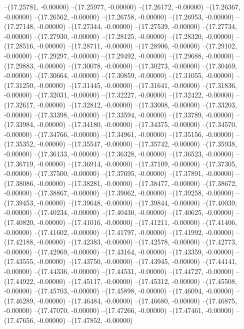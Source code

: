 --(17.25781, -0.00000)
--(17.25977, -0.00000)
--(17.26172, -0.00000)
--(17.26367, -0.00000)
--(17.26562, -0.00000)
--(17.26758, -0.00000)
--(17.26953, -0.00000)
--(17.27148, -0.00000)
--(17.27344, -0.00000)
--(17.27539, -0.00000)
--(17.27734, -0.00000)
--(17.27930, -0.00000)
--(17.28125, -0.00000)
--(17.28320, -0.00000)
--(17.28516, -0.00000)
--(17.28711, -0.00000)
--(17.28906, -0.00000)
--(17.29102, -0.00000)
--(17.29297, -0.00000)
--(17.29492, -0.00000)
--(17.29688, -0.00000)
--(17.29883, -0.00000)
--(17.30078, -0.00000)
--(17.30273, -0.00000)
--(17.30469, -0.00000)
--(17.30664, -0.00000)
--(17.30859, -0.00000)
--(17.31055, -0.00000)
--(17.31250, -0.00000)
--(17.31445, -0.00000)
--(17.31641, -0.00000)
--(17.31836, -0.00000)
--(17.32031, -0.00000)
--(17.32227, -0.00000)
--(17.32422, -0.00000)
--(17.32617, -0.00000)
--(17.32812, -0.00000)
--(17.33008, -0.00000)
--(17.33203, -0.00000)
--(17.33398, -0.00000)
--(17.33594, -0.00000)
--(17.33789, -0.00000)
--(17.33984, -0.00000)
--(17.34180, -0.00000)
--(17.34375, -0.00000)
--(17.34570, -0.00000)
--(17.34766, -0.00000)
--(17.34961, -0.00000)
--(17.35156, -0.00000)
--(17.35352, -0.00000)
--(17.35547, -0.00000)
--(17.35742, -0.00000)
--(17.35938, -0.00000)
--(17.36133, -0.00000)
--(17.36328, -0.00000)
--(17.36523, -0.00000)
--(17.36719, -0.00000)
--(17.36914, -0.00000)
--(17.37109, -0.00000)
--(17.37305, -0.00000)
--(17.37500, -0.00000)
--(17.37695, -0.00000)
--(17.37891, -0.00000)
--(17.38086, -0.00000)
--(17.38281, -0.00000)
--(17.38477, -0.00000)
--(17.38672, -0.00000)
--(17.38867, -0.00000)
--(17.39062, -0.00000)
--(17.39258, -0.00000)
--(17.39453, -0.00000)
--(17.39648, -0.00000)
--(17.39844, -0.00000)
--(17.40039, -0.00000)
--(17.40234, -0.00000)
--(17.40430, -0.00000)
--(17.40625, -0.00000)
--(17.40820, -0.00000)
--(17.41016, -0.00000)
--(17.41211, -0.00000)
--(17.41406, -0.00000)
--(17.41602, -0.00000)
--(17.41797, -0.00000)
--(17.41992, -0.00000)
--(17.42188, -0.00000)
--(17.42383, -0.00000)
--(17.42578, -0.00000)
--(17.42773, -0.00000)
--(17.42969, -0.00000)
--(17.43164, -0.00000)
--(17.43359, -0.00000)
--(17.43555, -0.00000)
--(17.43750, -0.00000)
--(17.43945, -0.00000)
--(17.44141, -0.00000)
--(17.44336, -0.00000)
--(17.44531, -0.00000)
--(17.44727, -0.00000)
--(17.44922, -0.00000)
--(17.45117, -0.00000)
--(17.45312, -0.00000)
--(17.45508, -0.00000)
--(17.45703, -0.00000)
--(17.45898, -0.00000)
--(17.46094, -0.00000)
--(17.46289, -0.00000)
--(17.46484, -0.00000)
--(17.46680, -0.00000)
--(17.46875, -0.00000)
--(17.47070, -0.00000)
--(17.47266, -0.00000)
--(17.47461, -0.00000)
--(17.47656, -0.00000)
--(17.47852, -0.00000)
